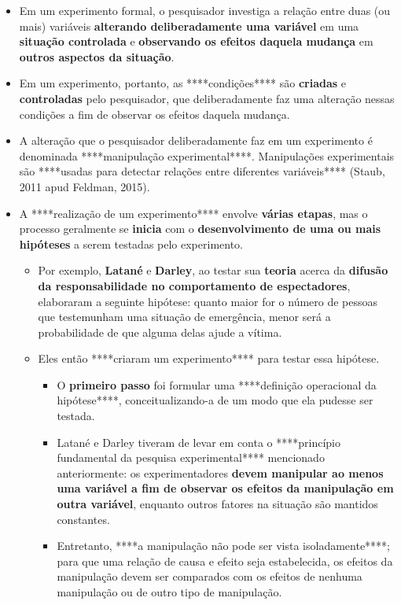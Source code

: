 \documentclass[
]{book}
\providecommand{\tightlist}{%
  \setlength{\itemsep}{0pt}\setlength{\parskip}{0pt}}
\begin{document}
\begin{itemize}
\tightlist
\item
  Em um experimento formal, o pesquisador investiga a relação entre duas
  (ou mais) variáveis \textbf{alterando deliberadamente uma variável} em
  uma \textbf{situação controlada} e \textbf{observando os efeitos
  daquela mudança} em \textbf{outros aspectos da situação}.
\item
  Em um experimento, portanto, as ****condições**** são \textbf{criadas}
  e \textbf{controladas} pelo pesquisador, que deliberadamente faz uma
  alteração nessas condições a fim de observar os efeitos daquela
  mudança.
\item
  A alteração que o pesquisador deliberadamente faz em um experimento é
  denominada ****manipulação experimental****. Manipulações
  experimentais são ****usadas para detectar relações entre diferentes
  variáveis**** (Staub, 2011 apud Feldman, 2015).
\item
  A ****realização de um experimento**** envolve \textbf{várias etapas},
  mas o processo geralmente se \textbf{inicia} com o
  \textbf{desenvolvimento de uma ou mais hipóteses} a serem testadas
  pelo experimento.

  \begin{itemize}
  \tightlist
  \item
    Por exemplo, \textbf{Latané} e \textbf{Darley}, ao testar sua
    \textbf{teoria} acerca da \textbf{difusão da responsabilidade no
    comportamento de espectadores}, elaboraram a seguinte hipótese:
    quanto maior for o número de pessoas que testemunham uma situação de
    emergência, menor será a probabilidade de que alguma delas ajude a
    vítima.
  \item
    Eles então ****criaram um experimento**** para testar essa hipótese.

    \begin{itemize}
    \tightlist
    \item
      O \textbf{primeiro passo} foi formular uma ****definição
      operacional da hipótese****, conceitualizando-a de um modo que ela
      pudesse ser testada.
    \item
      Latané e Darley tiveram de levar em conta o ****princípio
      fundamental da pesquisa experimental**** mencionado anteriormente:
      os experimentadores \textbf{devem manipular ao menos uma variável
      a fim de observar os efeitos da manipulação em outra variável},
      enquanto outros fatores na situação são mantidos constantes.
    \item
      Entretanto, ****a manipulação não pode ser vista isoladamente****;
      para que uma relação de causa e efeito seja estabelecida, os
      efeitos da manipulação devem ser comparados com os efeitos de
      nenhuma manipulação ou de outro tipo de manipulação.
    \end{itemize}
  \end{itemize}
\end{itemize}
\end{document}
